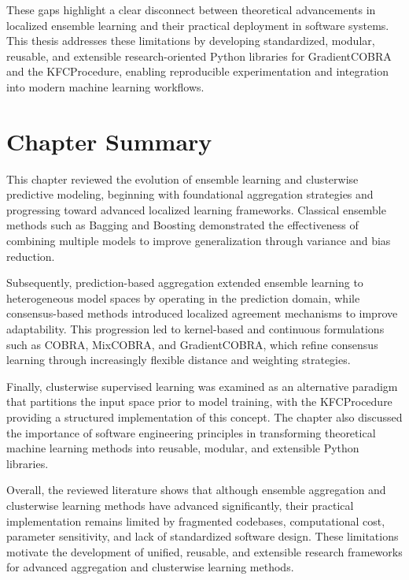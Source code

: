 These gaps highlight a clear disconnect between theoretical advancements in localized ensemble learning and their practical deployment in software systems. This thesis addresses these limitations by developing standardized, modular, reusable, and extensible research-oriented Python libraries for GradientCOBRA and the KFCProcedure, enabling reproducible experimentation and integration into modern machine learning workflows.


\section{Chapter Summary}

\hs This chapter reviewed the evolution of ensemble learning and clusterwise predictive modeling, beginning with foundational aggregation strategies and progressing toward advanced localized learning frameworks. Classical ensemble methods such as Bagging and Boosting demonstrated the effectiveness of combining multiple models to improve generalization through variance and bias reduction.

Subsequently, prediction-based aggregation extended ensemble learning to heterogeneous model spaces by operating in the prediction domain, while consensus-based methods introduced localized agreement mechanisms to improve adaptability. This progression led to kernel-based and continuous formulations such as COBRA, MixCOBRA, and GradientCOBRA, which refine consensus learning through increasingly flexible distance and weighting strategies.

Finally, clusterwise supervised learning was examined as an alternative paradigm that partitions the input space prior to model training, with the KFCProcedure providing a structured implementation of this concept. The chapter also discussed the importance of software engineering principles in transforming theoretical machine learning methods into reusable, modular, and extensible Python libraries.

Overall, the reviewed literature shows that although ensemble aggregation and clusterwise learning methods have advanced significantly, their practical implementation remains limited by fragmented codebases, computational cost, parameter sensitivity, and lack of standardized software design. These limitations motivate the development of unified, reusable, and extensible research frameworks for advanced aggregation and clusterwise learning methods.


